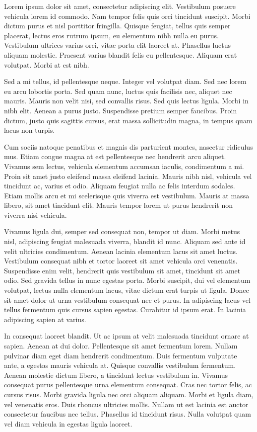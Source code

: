Lorem ipsum dolor sit amet, consectetur adipiscing elit. Vestibulum posuere vehicula lorem id commodo. Nam tempor felis quis orci tincidunt suscipit. Morbi dictum purus et nisl porttitor fringilla. Quisque feugiat, tellus quis semper placerat, lectus eros rutrum ipsum, eu elementum nibh nulla eu purus. Vestibulum ultrices varius orci, vitae porta elit laoreet at. Phasellus luctus aliquam molestie. Praesent varius blandit felis eu pellentesque. Aliquam erat volutpat. Morbi at est nibh.

Sed a mi tellus, id pellentesque neque. Integer vel volutpat diam. Sed nec lorem eu arcu lobortis porta. Sed quam nunc, luctus quis facilisis nec, aliquet nec mauris. Mauris non velit nisi, sed convallis risus. Sed quis lectus ligula. Morbi in nibh elit. Aenean a purus justo. Suspendisse pretium semper faucibus. Proin dictum, justo quis sagittis cursus, erat massa sollicitudin magna, in tempus quam lacus non turpis.

Cum sociis natoque penatibus et magnis dis parturient montes, nascetur ridiculus mus. Etiam congue magna at est pellentesque nec hendrerit arcu aliquet. Vivamus sem lectus, vehicula elementum accumsan iaculis, condimentum a mi. Proin sit amet justo eleifend massa eleifend lacinia. Mauris nibh nisl, vehicula vel tincidunt ac, varius et odio. Aliquam feugiat nulla ac felis interdum sodales. Etiam mollis arcu et mi scelerisque quis viverra est vestibulum. Mauris at massa libero, sit amet tincidunt elit. Mauris tempor lorem ut purus hendrerit non viverra nisi vehicula.

Vivamus ligula dui, semper sed consequat non, tempor ut diam. Morbi metus nisl, adipiscing feugiat malesuada viverra, blandit id nunc. Aliquam sed ante id velit ultricies condimentum. Aenean lacinia elementum lacus sit amet luctus. Vestibulum consequat nibh et tortor laoreet sit amet vehicula orci venenatis. Suspendisse enim velit, hendrerit quis vestibulum sit amet, tincidunt sit amet odio. Sed gravida tellus in nunc egestas porta. Morbi suscipit, dui vel elementum volutpat, lectus nulla elementum lacus, vitae dictum erat turpis ut ligula. Donec sit amet dolor ut urna vestibulum consequat nec et purus. In adipiscing lacus vel tellus fermentum quis cursus sapien egestas. Curabitur id ipsum erat. In lacinia adipiscing sapien at varius.

In consequat laoreet blandit. Ut ac ipsum at velit malesuada tincidunt ornare at sapien. Aenean at dui dolor. Pellentesque sit amet fermentum lorem. Nullam pulvinar diam eget diam hendrerit condimentum. Duis fermentum vulputate ante, a egestas mauris vehicula at. Quisque convallis vestibulum fermentum. Aenean molestie dictum libero, a tincidunt lectus vestibulum in. Vivamus consequat purus pellentesque urna elementum consequat. Cras nec tortor felis, ac cursus risus. Morbi gravida ligula nec orci aliquam aliquam. Morbi et ligula diam, vel venenatis eros. Duis rhoncus ultricies mollis. Nullam ut est lacinia est auctor consectetur faucibus nec tellus. Phasellus id tincidunt risus. Nulla volutpat quam vel diam vehicula in egestas ligula laoreet.

